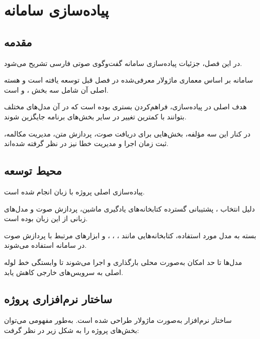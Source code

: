 
\chapter{پیاده‌سازی سامانه}

\section{مقدمه}

در این فصل، جزئیات پیاده‌سازی سامانه گفت‌وگوی صوتی فارسی
تشریح می‌شود.

سامانه بر اساس معماری ماژولار معرفی‌شده در فصل قبل توسعه
یافته است و هسته اصلی آن شامل سه بخش
،
و
است.

هدف اصلی در پیاده‌سازی، فراهم‌کردن بستری بوده است که در آن
مدل‌های مختلف بتوانند با کمترین تغییر در سایر بخش‌های برنامه
جایگزین شوند.

در کنار این سه مؤلفه، بخش‌هایی برای دریافت صوت، پردازش متن،
مدیریت مکالمه، ثبت زمان اجرا و مدیریت خطا نیز در نظر گرفته
شده‌اند.


\section{محیط توسعه}

پیاده‌سازی اصلی پروژه با زبان
انجام شده است.

دلیل انتخاب ، پشتیبانی گسترده کتابخانه‌های یادگیری
ماشین، پردازش صوت و مدل‌های زبانی از این زبان بوده است.

بسته به مدل مورد استفاده، کتابخانه‌هایی مانند
،
،
،
و ابزارهای مرتبط با پردازش صوت در سامانه استفاده می‌شوند.

مدل‌ها تا حد امکان به‌صورت محلی بارگذاری و اجرا می‌شوند تا
وابستگی خط لوله اصلی به سرویس‌های خارجی کاهش یابد.


\section{ساختار نرم‌افزاری پروژه}

ساختار نرم‌افزار به‌صورت ماژولار طراحی شده است.
به‌طور مفهومی می‌توان بخش‌های پروژه را به شکل زیر در نظر گرفت:

